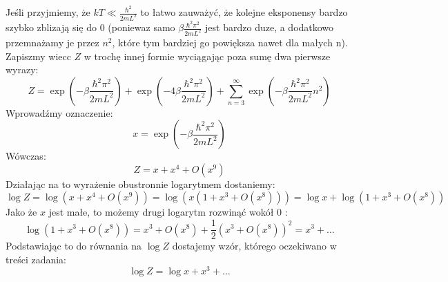 \documentclass[12pt,a4paper]{article}
\begin{document}
Jeśli przyjmiemy, że $k T \ll \frac{\hbar^{2}}{2 m L^{2}}$ to łatwo zauważyć, że kolejne eksponensy bardzo szybko zblizają się do 0 (poniewaz samo $\beta \frac{\hbar^{2} \pi^{2}}{2 m L^{2}}$ jest bardzo duze, a dodatkowo przemnażamy je przez $n^{2}$, które tym bardziej go powiększa nawet dla małych n). Zapiszmy wiecc $Z$ w trochę innej formie wyciągając poza sumę dwa pierwsze wyrazy:
$$
Z=\exp \left(-\beta \frac{\hbar^{2} \pi^{2}}{2 m L^{2}}\right)+\exp \left(-4 \beta \frac{\hbar^{2} \pi^{2}}{2 m L^{2}}\right)+\sum_{n=3}^{\infty} \exp \left(-\beta \frac{\hbar^{2} \pi^{2}}{2 m L^{2}} n^{2}\right)
$$
Wprowadźmy oznaczenie:
$$
x=\exp \left(-\beta \frac{\hbar^{2} \pi^{2}}{2 m L^{2}}\right)
$$
Wówczas:
$$
Z=x+x^{4}+O\left(x^{9}\right)
$$
Działając na to wyrażenie obustronnie logarytmem dostaniemy:
$$
\log Z=\log \left(x+x^{4}+O\left(x^{9}\right)\right)=\log \left(x\left(1+x^{3}+O\left(x^{8}\right)\right)\right)=\log x+\log \left(1+x^{3}+O\left(x^{8}\right)\right)
$$
Jako że $x$ jest małe, to możemy drugi logarytm rozwinąć wokół 0 :
$$
\log \left(1+x^{3}+O\left(x^{8}\right)\right)=x^{3}+O\left(x^{8}\right)+\frac{1}{2}\left(x^{3}+O\left(x^{8}\right)\right)^{2}=x^{3}+\ldots
$$
Podstawiając to do równania na $\log Z$ dostajemy wzór, którego oczekiwano w treści zadania:
$$
\log Z=\log x+x^{3}+\ldots
$$
\end{document}
